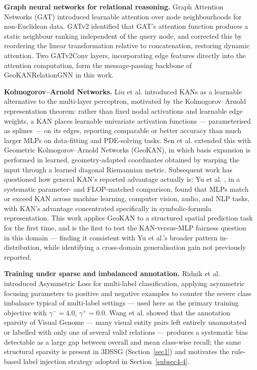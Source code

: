 \documentclass[sn-mathphys,Numbered]{sn-jnl}
\begin{document}
\textbf{Graph neural networks for relational reasoning.} Graph Attention Networks (GAT) \cite{velickovic2018gat} introduced learnable attention over node neighbourhoods for non-Euclidean data. GATv2 \cite{brody2022gatv2} identified that GAT's attention function produces a static neighbour ranking independent of the query node, and corrected this by reordering the linear transformation relative to concatenation, restoring dynamic attention. Two GATv2Conv layers, incorporating edge features directly into the attention computation, form the message-passing backbone of GeoKANRelationGNN in this work.

\textbf{Kolmogorov--Arnold Networks.} Liu et al. \cite{liu2024kan} introduced KANs as a learnable alternative to the multi-layer perceptron, motivated by the Kolmogorov--Arnold representation theorem: rather than fixed nodal activations and learnable edge weights, a KAN places learnable univariate activation functions --- parameterised as splines --- on its edges, reporting comparable or better accuracy than much larger MLPs on data-fitting and PDE-solving tasks. Sen et al. \cite{sen2026geokan} extended this with Geometric Kolmogorov--Arnold Networks (GeoKAN), in which basis expansion is performed in learned, geometry-adapted coordinates obtained by warping the input through a learned diagonal Riemannian metric. Subsequent work has questioned how general KAN's reported advantage actually is: Yu et al. \cite{yu2024kanmlp}, in a systematic parameter- and FLOP-matched comparison, found that MLPs match or exceed KAN across machine learning, computer vision, audio, and NLP tasks, with KAN's advantage concentrated specifically in symbolic-formula representation. This work applies GeoKAN to a structured spatial prediction task for the first time, and is the first to test the KAN-versus-MLP fairness question in this domain --- finding it consistent with Yu et al.'s broader pattern in-distribution, while identifying a cross-domain generalisation gain not previously reported.

\textbf{Training under sparse and imbalanced annotation.} Ridnik et al. \cite{ridnik2021asl} introduced Asymmetric Loss for multi-label classification, applying asymmetric focusing parameters to positive and negative examples to counter the severe class imbalance typical of multi-label settings --- used here as the primary training objective with $\gamma^-=4.0$, $\gamma^+=0.0$. Wang et al. \cite{wang2020unannotated} showed that the annotation sparsity of Visual Genome --- many visual entity pairs left entirely unannotated or labelled with only one of several valid relations --- produces a systematic bias detectable as a large gap between overall and mean class-wise recall; the same structural sparsity is present in 3DSSG (Section~\ref{sec1}) and motivates the rule-based label injection strategy adopted in Section~\ref{subsec4-4}.
\end{document}
